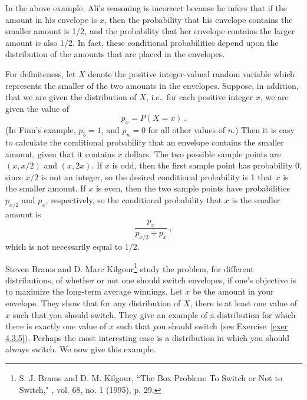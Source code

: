 In the above example, Ali's reasoning is incorrect because he infers that if the amount
in his envelope is $x$, then the probability that his envelope contains the smaller amount
is 1/2, and the probability that her envelope contains the larger amount is also 1/2.  In 
fact, these conditional probabilities depend upon the distribution of the amounts that
are placed in the envelopes.
\par
For definiteness, let $X$ denote the positive integer-valued random variable which represents
the smaller of the two amounts in the envelopes.  Suppose, in addition, that we are given 
the distribution of $X$, i.e., for each positive integer $x$, we are given the value of 
$$p_x = P(X = x)\ .$$
(In Finn's example, $p_5 = 1$, and $p_{n} = 0$ for all other values of $n$.)
Then it is easy to calculate the conditional probability that an envelope contains the 
smaller amount, given that it contains $x$ dollars.  The two possible sample points are
$(x, x/2)$ and $(x, 2x)$.  If $x$ is odd, then the first sample point has probability 0,
since $x/2$ is not an integer, so the desired conditional probability is 1 that $x$ is 
the smaller amount.  If $x$ is even, then the two sample points have probabilities $p_{x/2}$ 
and $p_x$, respectively, so the conditional probability that $x$ is the smaller amount is
$$\frac{p_x}{p_{x/2} + p_x}\ ,$$
which is not necessarily equal to 1/2.
\par
Steven Brams and D. Marc Kilgour\footnote{S. J. Brams
and D. M. Kilgour, ``The Box Problem:  To Switch or Not to Switch," ,
vol. 68, no. 1 (1995),  p. 29.} study the problem, for different distributions, of whether or
not one should  switch envelopes, if one's objective is to maximize the long-term average
winnings.  Let
$x$ be the amount in your envelope.  They show that for any distribution of $X$, there
is at least one value of $x$ such that you should switch.  They give an example of a 
distribution for which there is exactly one value of $x$ such that you should switch (see
Exercise~\ref{exer 4.3.5}).  Perhaps the most interesting case is a distribution in which
you should always switch.  We now give this example.

